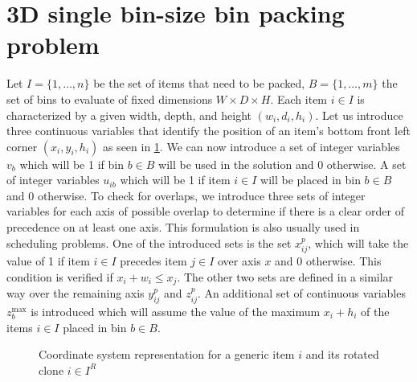 \section{3D single bin-size bin packing problem}
\label{sec:milp}%
Let $I = \{1,\dots, n \}$ be the set of items that need to be packed, $B = \{1,\dots, m \}$ the set of bins to evaluate of fixed dimensions $W \times D \times H$.
Each item $i \in I$ is characterized by a given width, depth, and height $(w_i, d_i, h_i)$. 
Let us introduce three continuous variables that identify the position of an item's bottom front left corner $(x_i, y_i, h_i)$ as seen in \cref{fig:coordinate_system}.
We can now introduce a set of integer variables $v_{b}$ which will be 1 if bin $b \in B$ will be used in the solution and 0 otherwise. A set of integer variables $u_{ib}$ which will be 1 if item $i \in I$ will be placed in bin $b \in B$ and 0 otherwise.
To check for overlaps, we introduce three sets of integer variables for each axis of possible overlap to determine if there is a clear order of precedence on at least one axis. This formulation is also usually used in scheduling problems.
One of the introduced sets is the set $x^p_{ij}$, which will take the value of 1 if item $i \in I$ precedes item $j \in I$ over axis $x$ and 0 otherwise. This condition is verified if $x_i + w_i \le x_j$. 
The other two sets are defined in a similar way over the remaining axis $y^p_{ij}$ and $z^p_{ij}$.
An additional set of continuous variables $z_b^\text{max}$ is introduced which will assume the value of the maximum $x_i + h_i$ of the items $i \in I$ placed in bin $b \in B$.

\begin{figure}
    \scalebox{0.62}{%
    
    }
    \caption{Coordinate system representation for a generic item $i$ and its rotated clone $i \in I^R$}
    \label{fig:coordinate_system}
\end{figure}

